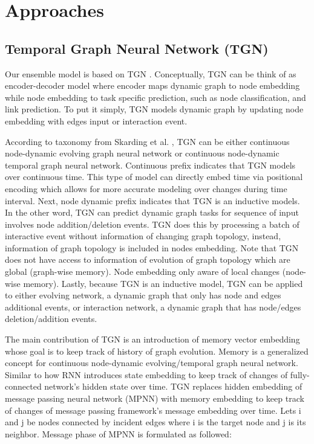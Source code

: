 \documentclass{IEEEtran}
\begin{document}
\section{Approaches}
\label{sec:org96d7d83}
\subsection{Temporal Graph Neural Network (TGN)}
\label{sec:org3177855}

Our ensemble model is based on TGN \cite{rossi2020temporal}. Conceptually, TGN can be think of as encoder-decoder model where encoder maps dynamic graph to node embedding while node embedding to task specific prediction, such as node classification, and link prediction. To put it simply, TGN models dynamic graph by updating node embedding with edges input or interaction event.

According to taxonomy from Skarding et al. \cite{skardingFoundationsModelingDynamic2021}, TGN can be either continuous node-dynamic evolving graph neural network or continuous node-dynamic temporal graph neural network. Continuous prefix indicates that TGN models over continuous time. This type of model can directly embed time via positional encoding which allows for more accurate modeling over changes during time interval. Next, node dynamic prefix indicates that TGN is an inductive models. In the other word, TGN can predict dynamic graph tasks for sequence of input involves node addition/deletion events. TGN does this by processing a batch of interactive event without information of changing graph topology, instead, information of graph topology is included in nodes embedding. Note that TGN does not have access to information of evolution of graph topology which are global (graph-wise memory). Node embedding only aware of local changes (node-wise memory). Lastly, because TGN is an inductive model, TGN can be applied to either evolving network, a dynamic graph that only has node and edges additional events, or interaction network, a dynamic graph that has node/edges deletion/addition events.


The main contribution of TGN is an introduction of memory vector embedding whose goal is to keep track of history of graph evolution. Memory is a generalized concept for continuous node-dynamic evolving/temporal graph neural network. Similar to how RNN introduces state embedding to keep track of changes of fully-connected network's hidden state over time. TGN replaces hidden embedding of message passing neural network (MPNN) with memory embedding to keep track of changes of message passing framework's message embedding over time. Lets i and j be nodes connected by incident edges where i is the target node and j is its neighbor. Message phase of MPNN \cite{gilmer2017neural} is formulated as followed:
\end{document}
